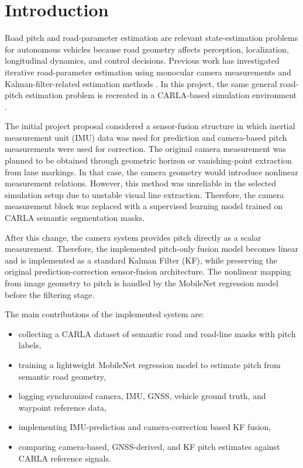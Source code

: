 \documentclass[conference]{IEEEtran}
\begin{document}
\section{Introduction}
Road pitch and road-parameter estimation are relevant state-estimation problems for autonomous vehicles because road geometry affects perception, localization, longitudinal dynamics, and control decisions. Previous work has investigated iterative road-parameter estimation using monocular camera measurements and Kalman-filter-related estimation methods \cite{ustunel2023iterative}. In this project, the same general road-pitch estimation problem is recreated in a CARLA-based simulation environment \cite{dosovitskiy2017carla}.

The initial project proposal considered a sensor-fusion structure in which inertial measurement unit (IMU) data was used for prediction and camera-based pitch measurements were used for correction. The original camera measurement was planned to be obtained through geometric horizon or vanishing-point extraction from lane markings. In that case, the camera geometry would introduce nonlinear measurement relations. However, this method was unreliable in the selected simulation setup due to unstable visual line extraction. Therefore, the camera measurement block was replaced with a supervised learning model trained on CARLA semantic segmentation masks.

After this change, the camera system provides pitch directly as a scalar measurement. Therefore, the implemented pitch-only fusion model becomes linear and is implemented as a standard Kalman Filter (KF), while preserving the original prediction-correction sensor-fusion architecture. The nonlinear mapping from image geometry to pitch is handled by the MobileNet regression model before the filtering stage.

The main contributions of the implemented system are:
\begin{itemize}
    \item collecting a CARLA dataset of semantic road and road-line masks with pitch labels,
    \item training a lightweight MobileNet regression model to estimate pitch from semantic road geometry,
    \item logging synchronized camera, IMU, GNSS, vehicle ground truth, and waypoint reference data,
    \item implementing IMU-prediction and camera-correction based KF fusion,
    \item comparing camera-based, GNSS-derived, and KF pitch estimates against CARLA reference signals.
\end{itemize}
\end{document}
